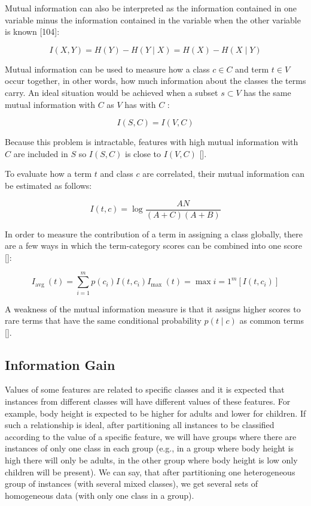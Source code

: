 Mutual information can also be interpreted as the information contained in one variable minus the information contained in the variable when the other variable is known [104]:


\begin{equation*}
I(X, Y)=H(Y)-H(Y \mid X)=H(X)-H(X \mid Y) \tag{14.14}
\end{equation*}


Mutual information can be used to measure how a class $c \in C$ and term $t \in V$ occur together, in other words, how much information about the classes the terms carry. An ideal situation would be achieved when a subset $s \subset V$ has the same mutual information with $C$ as $V$ has with $C$ :


\begin{equation*}
I(S, C)=I(V, C) \tag{14.15}
\end{equation*}


Because this problem is intractable, features with high mutual information with $C$ are included in $S$ so $I(S, C)$ is close to $I(V, C)$ [\cite{ref176}].

To evaluate how a term $t$ and class $c$ are correlated, their mutual information can be estimated as follows:


\begin{equation*}
I(t, c)=\log \frac{A N}{(A+C)(A+B)} \tag{14.16}
\end{equation*}


In order to measure the contribution of a term in assigning a class globally, there are a few ways in which the term-category scores can be combined into one score [\cite{ref286}]:


\begin{equation*}
I_{\text {avg }}(t)=\sum_{i=1}^{m} p\left(c_{i}\right) I\left(t, c_{i}\right) I_{\text {max }}(t)=\max i=1^{m}\left[I\left(t, c_{i}\right)\right] \tag{14.17}
\end{equation*}


A weakness of the mutual information measure is that it assigns higher scores to rare terms that have the same conditional probability $p(t \mid c)$ as common terms [\cite{ref286}].

\subsection{Information Gain}
Values of some features are related to specific classes and it is expected that instances from different classes will have different values of these features. For\\
example, body height is expected to be higher for adults and lower for children. If such a relationship is ideal, after partitioning all instances to be classified according to the value of a specific feature, we will have groups where there are instances of only one class in each group (e.g., in a group where body height is high there will only be adults, in the other group where body height is low only children will be present). We can say, that after partitioning one heterogeneous group of instances (with several mixed classes), we get several sets of homogeneous data (with only one class in a group).

